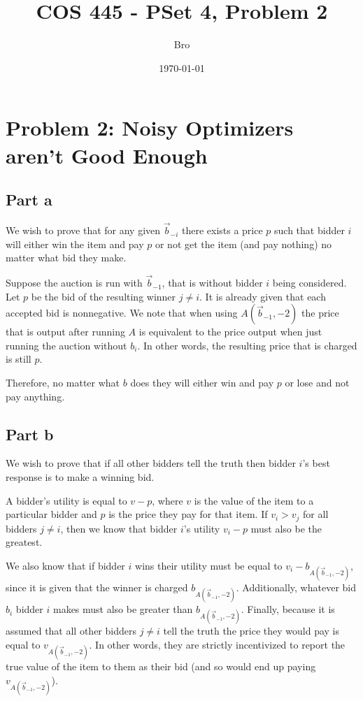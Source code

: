 \documentclass[12pt]{article}%
\begin{document}
\title{COS 445 - PSet 4, Problem 2} %
\author{Bro} %
\date{\today}
\maketitle
\section*{Problem 2: Noisy Optimizers aren’t Good Enough}
\subsection*{Part a}
We wish to prove that for any given $\vec{b}_{-i}$ there exists a price $p$ such that bidder $i$ will either win the item and pay $p$ or not get the item (and pay nothing) no matter what bid they make.

Suppose the auction is run with $\vec{b}_{-1}$, that is without bidder $i$ being considered. Let $p$ be the bid of the resulting winner $j \neq i$. It is already given that each accepted bid is nonnegative. We note that when using $A(\vec{b}_{-1}, -2)$ the price that is output after running $A$ is equivalent to the price output when just running the auction without $b_i$. In other words, the resulting price that is charged is still $p$.

Therefore, no matter what $b$ does they will either win and pay $p$ or lose and not pay anything.

\subsection*{Part b}
We wish to prove that if all other bidders tell the truth then bidder $i$'s best response is to make a winning bid.

A bidder's utility is equal to $v - p$, where $v$ is the value of the item to a particular bidder and $p$ is the price they pay for that item. If $v_i > v_j$ for all bidders $j \neq i$, then we know that bidder $i$'s utility $v_i - p$ must also be the greatest.

We also know that if bidder $i$ wins their utility must be equal to $v_i - b_{A(\vec{b}_{-1}, -2)}$, since it is given that the winner is charged $b_{A(\vec{b}_{-1}, -2)}$. Additionally, whatever bid $b_i$ bidder $i$ makes must also be greater than $b_{A(\vec{b}_{-1}, -2)}$. Finally, because it is assumed that all other bidders $j \neq i$ tell the truth the price they would pay is equal to $v_{A(\vec{b}_{-1}, -2)}$. In other words, they are strictly incentivized to report the true value of the item to them as their bid (and so would end up paying $v_{A(\vec{b}_{-1}, -2)}$).
\end{document}
